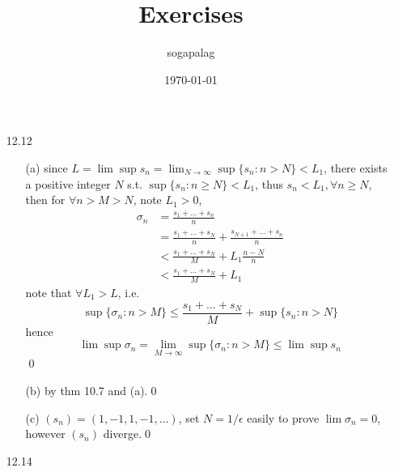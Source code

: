\documentclass[paper=a4, fontsize=11pt]{scrartcl} %
\title{Exercises}
\author{sogapalag}
\date{\normalsize\today}
\numberwithin{equation}{section} %
\numberwithin{figure}{section} %
\numberwithin{table}{section} %
\begin{document}
\maketitle
\begin{itemize}
\item[12.12] \begin{itemize}
		\item[(a)]  since $L=\lim\sup s_n = \lim_{N\rightarrow \infty}\sup\{s_n:n>N\} <L_1$, there exists a positive integer $N$ s.t. $\sup\{s_n:n\geq N\}<L_1$, thus $s_n<L_1, \forall n\geq N$, then for $\forall n>M>N$, note $L_1>0$, \begin{equation}\begin{split}
			\sigma_n &= \frac{s_1+\dots+s_n}{n} \\
					&= \frac{s_1+\dots+s_N}{n} + \frac{s_{N+1}+\dots+s_n}{n} \\
					&< \frac{s_1+\dots+s_N}{M} + L_1 \frac{n-N}{n} \\
					&< \frac{s_1+\dots+s_N}{M} + L_1
		\end{split}\end{equation}
		note that $\forall L_1>L$, i.e. \begin{equation}
			\sup\{\sigma_n:n>M\} \leq \frac{s_1+\dots+s_N}{M} + \sup\{s_n:n>N\}
		\end{equation}
		hence \begin{equation}
			\lim \sup \sigma_n = \lim_{M\rightarrow\infty}\sup\{\sigma_n:n>M\} \leq \lim\sup s_n
		\end{equation}\qed
		\item[(b)] %
		by thm 10.7 and (a).\qed
		\item[(c)] $(s_n)=(1,-1,1,-1,...)$, set $N=1/\epsilon$ easily to prove $\lim \sigma_n=0$, however $(s_n)$ diverge.\qed
	\end{itemize}
\item[12.14] \begin{itemize}

\end{itemize}
\end{itemize}
\end{document}
